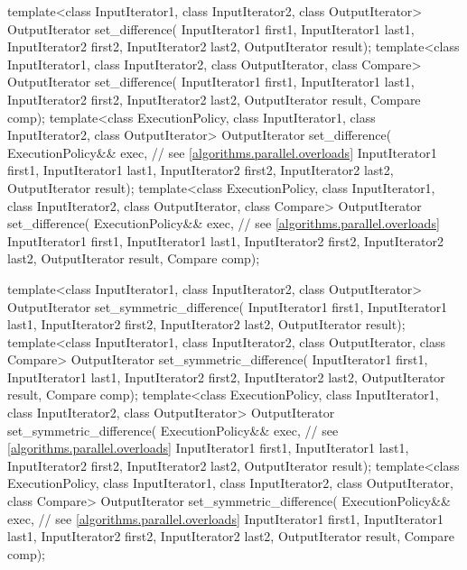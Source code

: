 \begin{codeblock}
{  template<class InputIterator1, class InputIterator2, class OutputIterator>
    OutputIterator set_difference(
      InputIterator1 first1, InputIterator1 last1,
      InputIterator2 first2, InputIterator2 last2,
      OutputIterator result);
  template<class InputIterator1, class InputIterator2, class OutputIterator, class Compare>
    OutputIterator set_difference(
      InputIterator1 first1, InputIterator1 last1,
      InputIterator2 first2, InputIterator2 last2,
      OutputIterator result, Compare comp);
  template<class ExecutionPolicy, class InputIterator1, class InputIterator2,
           class OutputIterator>
    OutputIterator set_difference(
      ExecutionPolicy&& exec, // see \ref{algorithms.parallel.overloads}
      InputIterator1 first1, InputIterator1 last1,
      InputIterator2 first2, InputIterator2 last2,
      OutputIterator result);
  template<class ExecutionPolicy, class InputIterator1, class InputIterator2,
           class OutputIterator, class Compare>
    OutputIterator set_difference(
      ExecutionPolicy&& exec, // see \ref{algorithms.parallel.overloads}
      InputIterator1 first1, InputIterator1 last1,
      InputIterator2 first2, InputIterator2 last2,
      OutputIterator result, Compare comp);

  template<class InputIterator1, class InputIterator2, class OutputIterator>
    OutputIterator set_symmetric_difference(
      InputIterator1 first1, InputIterator1 last1,
      InputIterator2 first2, InputIterator2 last2,
      OutputIterator result);
  template<class InputIterator1, class InputIterator2, class OutputIterator, class Compare>
    OutputIterator set_symmetric_difference(
      InputIterator1 first1, InputIterator1 last1,
      InputIterator2 first2, InputIterator2 last2,
      OutputIterator result, Compare comp);
  template<class ExecutionPolicy, class InputIterator1, class InputIterator2,
           class OutputIterator>
    OutputIterator set_symmetric_difference(
      ExecutionPolicy&& exec, // see \ref{algorithms.parallel.overloads}
      InputIterator1 first1, InputIterator1 last1,
      InputIterator2 first2, InputIterator2 last2,
      OutputIterator result);
  template<class ExecutionPolicy, class InputIterator1, class InputIterator2,
           class OutputIterator, class Compare>
    OutputIterator set_symmetric_difference(
      ExecutionPolicy&& exec, // see \ref{algorithms.parallel.overloads}
      InputIterator1 first1, InputIterator1 last1,
      InputIterator2 first2, InputIterator2 last2,
      OutputIterator result, Compare comp);

}
\end{codeblock}

